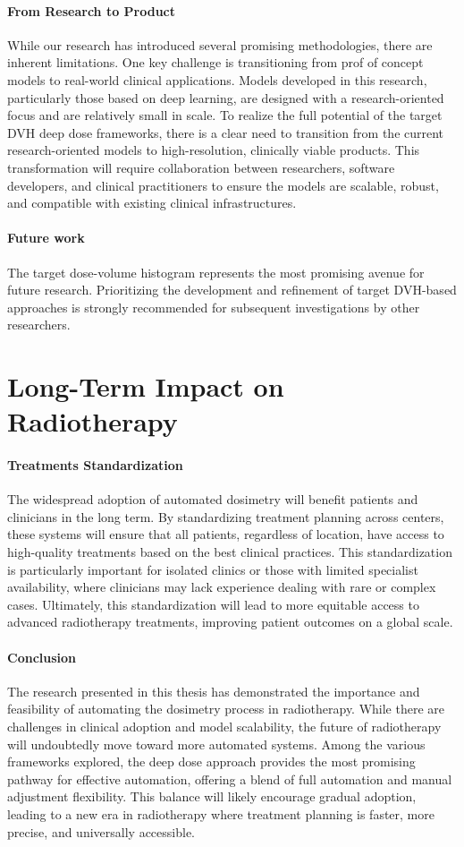 \paragraph{From Research to Product}
While our research has introduced several promising methodologies, there are inherent limitations.
One key challenge is transitioning from prof of concept models to real-world clinical applications.
Models developed in this research, particularly those based on deep learning, are designed with a research-oriented focus and are relatively small in scale.
To realize the full potential of the target DVH deep dose frameworks, there is a clear need to transition from the current research-oriented models to high-resolution, clinically viable products.
This transformation will require collaboration between researchers, software developers, and clinical practitioners to ensure the models are scalable, robust, and compatible with existing clinical infrastructures.

\paragraph{Future work}
The target dose-volume histogram represents the most promising avenue for future research.
Prioritizing the development and refinement of target DVH-based approaches is strongly recommended for subsequent investigations by other researchers.

\section{Long-Term Impact on Radiotherapy}
\paragraph{Treatments Standardization}
The widespread adoption of automated dosimetry will benefit patients and clinicians in the long term.
By standardizing treatment planning across centers, these systems will ensure that all patients, regardless of location, have access to high-quality treatments based on the best clinical practices.
This standardization is particularly important for isolated clinics or those with limited specialist availability, where clinicians may lack experience dealing with rare or complex cases.
Ultimately, this standardization will lead to more equitable access to advanced radiotherapy treatments, improving patient outcomes on a global scale.

\paragraph{Conclusion}
The research presented in this thesis has demonstrated the importance and feasibility of automating the dosimetry process in radiotherapy.
While there are challenges in clinical adoption and model scalability, the future of radiotherapy will undoubtedly move toward more automated systems.
Among the various frameworks explored, the deep dose approach provides the most promising pathway for effective automation, offering a blend of full automation and manual adjustment flexibility.
This balance will likely encourage gradual adoption, leading to a new era in radiotherapy where treatment planning is faster, more precise, and universally accessible.
